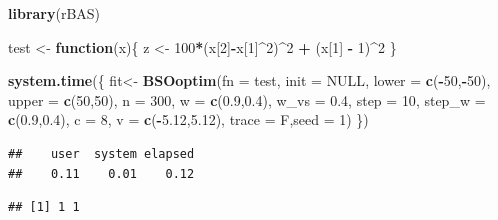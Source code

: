 \documentclass[]{ctexbook}
\newenvironment{Shaded}{\begin{snugshade}}{\end{snugshade}}
\newcommand{\KeywordTok}[1]{\textcolor[rgb]{0.13,0.29,0.53}{\textbf{#1}}}
\newcommand{\DataTypeTok}[1]{\textcolor[rgb]{0.13,0.29,0.53}{#1}}
\newcommand{\DecValTok}[1]{\textcolor[rgb]{0.00,0.00,0.81}{#1}}
\newcommand{\FloatTok}[1]{\textcolor[rgb]{0.00,0.00,0.81}{#1}}
\newcommand{\StringTok}[1]{\textcolor[rgb]{0.31,0.60,0.02}{#1}}
\newcommand{\OtherTok}[1]{\textcolor[rgb]{0.56,0.35,0.01}{#1}}
\newcommand{\ControlFlowTok}[1]{\textcolor[rgb]{0.13,0.29,0.53}{\textbf{#1}}}
\newcommand{\OperatorTok}[1]{\textcolor[rgb]{0.81,0.36,0.00}{\textbf{#1}}}
\newcommand{\NormalTok}[1]{#1}
\begin{document}
\begin{Shaded}
\begin{Highlighting}[]
\KeywordTok{library}\NormalTok{(rBAS)}

\NormalTok{test <-}\StringTok{ }\ControlFlowTok{function}\NormalTok{(x)\{}
\NormalTok{  z <-}\StringTok{ }\DecValTok{100}\OperatorTok{*}\NormalTok{(x[}\DecValTok{2}\NormalTok{]}\OperatorTok{-}\NormalTok{x[}\DecValTok{1}\NormalTok{]}\OperatorTok{^}\DecValTok{2}\NormalTok{)}\OperatorTok{^}\DecValTok{2} \OperatorTok{+}\StringTok{ }\NormalTok{(x[}\DecValTok{1}\NormalTok{] }\OperatorTok{-}\StringTok{ }\DecValTok{1}\NormalTok{)}\OperatorTok{^}\DecValTok{2}
\NormalTok{\}}

\KeywordTok{system.time}\NormalTok{(\{}
\NormalTok{  fit<-}
\StringTok{    }\KeywordTok{BSOoptim}\NormalTok{(}\DataTypeTok{fn =}\NormalTok{ test,}
             \DataTypeTok{init =} \OtherTok{NULL}\NormalTok{,}
             \DataTypeTok{lower =} \KeywordTok{c}\NormalTok{(}\OperatorTok{-}\DecValTok{50}\NormalTok{,}\OperatorTok{-}\DecValTok{50}\NormalTok{),}
             \DataTypeTok{upper =} \KeywordTok{c}\NormalTok{(}\DecValTok{50}\NormalTok{,}\DecValTok{50}\NormalTok{),}
             \DataTypeTok{n =} \DecValTok{300}\NormalTok{,}
             \DataTypeTok{w =} \KeywordTok{c}\NormalTok{(}\FloatTok{0.9}\NormalTok{,}\FloatTok{0.4}\NormalTok{),}
             \DataTypeTok{w_vs =} \FloatTok{0.4}\NormalTok{, }
             \DataTypeTok{step =} \DecValTok{10}\NormalTok{,}
             \DataTypeTok{step_w =} \KeywordTok{c}\NormalTok{(}\FloatTok{0.9}\NormalTok{,}\FloatTok{0.4}\NormalTok{),}
             \DataTypeTok{c =} \DecValTok{8}\NormalTok{,}
             \DataTypeTok{v =} \KeywordTok{c}\NormalTok{(}\OperatorTok{-}\FloatTok{5.12}\NormalTok{,}\FloatTok{5.12}\NormalTok{),}
             \DataTypeTok{trace =}\NormalTok{ F,}\DataTypeTok{seed =} \DecValTok{1}\NormalTok{)}
\NormalTok{\})}
\end{Highlighting}
\end{Shaded}

\begin{verbatim}
##    user  system elapsed 
##    0.11    0.01    0.12
\end{verbatim}

\begin{Shaded}
\end{Shaded}

\begin{verbatim}
## [1] 1 1
\end{verbatim}
\end{document}
